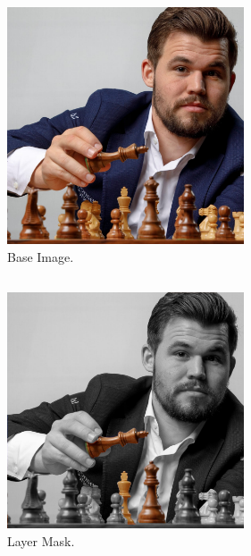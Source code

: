 \documentclass[12pt, a4]{article}
\begin{document}
\subsection*{}
\begin{figure}[h]
\centering
\caption{Base Image.}
\includegraphics[height=7cm, width=7cm]{Magnus.jpg}
\end{figure}


\subsection*{}
\begin{figure}[h]
\centering
\caption{Layer Mask.}
\includegraphics[height=7cm, width=7cm]{Magnus-LayerMask.jpg}
\end{figure}


\newpage
\end{document}
